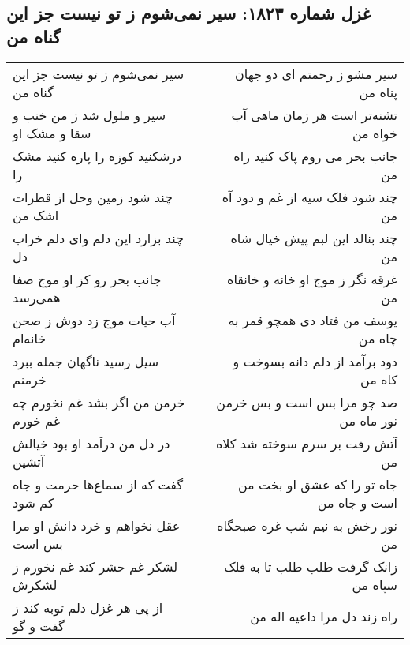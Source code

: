 \begin{center}
\section*{غزل شماره ۱۸۲۳: سیر نمی‌شوم ز تو نیست جز این گناه من}
\label{sec:1823}
\begin{longtable}{l p{0.5cm} r}
سیر نمی‌شوم ز تو نیست جز این گناه من
&&
سیر مشو ز رحمتم ای دو جهان پناه من
\\
سیر و ملول شد ز من خنب و سقا و مشک او
&&
تشنه‌تر است هر زمان ماهی آب خواه من
\\
درشکنید کوزه را پاره کنید مشک را
&&
جانب بحر می روم پاک کنید راه من
\\
چند شود زمین وحل از قطرات اشک من
&&
چند شود فلک سیه از غم و دود آه من
\\
چند بزارد این دلم وای دلم خراب دل
&&
چند بنالد این لبم پیش خیال شاه من
\\
جانب بحر رو کز او موج صفا همی‌رسد
&&
غرقه نگر ز موج او خانه و خانقاه من
\\
آب حیات موج زد دوش ز صحن خانه‌ام
&&
یوسف من فتاد دی همچو قمر به چاه من
\\
سیل رسید ناگهان جمله ببرد خرمنم
&&
دود برآمد از دلم دانه بسوخت و کاه من
\\
خرمن من اگر بشد غم نخورم چه غم خورم
&&
صد چو مرا بس است و بس خرمن نور ماه من
\\
در دل من درآمد او بود خیالش آتشین
&&
آتش رفت بر سرم سوخته شد کلاه من
\\
گفت که از سماع‌ها حرمت و جاه کم شود
&&
جاه تو را که عشق او بخت من است و جاه من
\\
عقل نخواهم و خرد دانش او مرا بس است
&&
نور رخش به نیم شب غره صبحگاه من
\\
لشکر غم حشر کند غم نخورم ز لشکرش
&&
زانک گرفت طلب طلب تا به فلک سپاه من
\\
از پی هر غزل دلم توبه کند ز گفت و گو
&&
راه زند دل مرا داعیه اله من
\\
\end{longtable}
\end{center}
